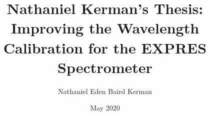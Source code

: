 \documentclass[12pt]{yalephd}
\begin{document}
\newcommand{\unit}[1]{\ensuremath{\, \mathrm{#1}}}

\titlespacing*{\chapter}{0pt}{50pt}{30pt}%

	\title{Nathaniel Kerman's Thesis:\\\large Improving the Wavelength Calibration for the EXPRES Spectrometer}
	\author{Nathaniel Eden Baird Kerman}
	\date{May 2020}


    
	
    \maketitle
    \makecopyright
	
    
    
	
    \tableofcontents %
    \listoffigures   %
    \listoftables    %
    
    \mainmatter      %
	
	
% 	


    
    
    
\end{document}
